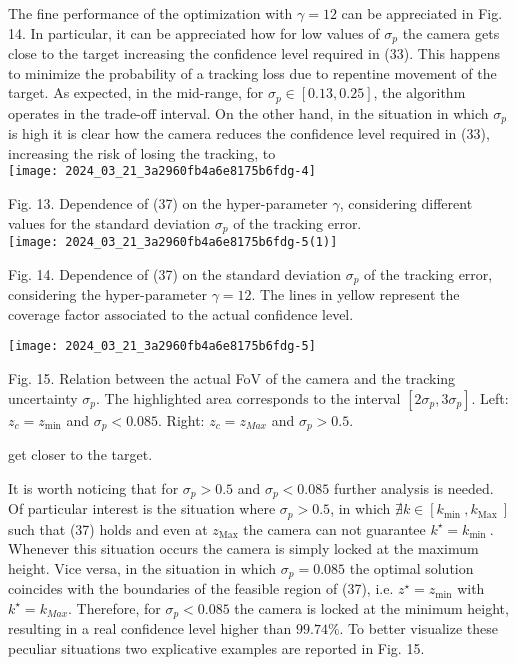 \documentclass[conference]{IEEEtran}
\begin{document}
The fine performance of the optimization with $\gamma=12$ can be appreciated in Fig. 14. In particular, it can be appreciated how for low values of $\sigma_{p}$ the camera gets close to the target increasing the confidence level required in (33). This happens to minimize the probability of a tracking loss due to repentine movement of the target. As expected, in the mid-range, for $\sigma_{p} \in[0.13,0.25]$, the algorithm operates in the trade-off interval. On the other hand, in the situation in which $\sigma_{p}$ is high it is clear how the camera reduces the confidence level required in (33), increasing the risk of losing the tracking, to\\
\texttt{[image: 2024\_03\_21\_3a2960fb4a6e8175b6fdg-4]}

Fig. 13. Dependence of (37) on the hyper-parameter $\gamma$, considering different values for the standard deviation $\sigma_{p}$ of the tracking error.\\
\texttt{[image: 2024\_03\_21\_3a2960fb4a6e8175b6fdg-5(1)]}

Fig. 14. Dependence of (37) on the standard deviation $\sigma_{p}$ of the tracking error, considering the hyper-parameter $\gamma=12$. The lines in yellow represent the coverage factor associated to the actual confidence level.

\begin{center}
\texttt{[image: 2024\_03\_21\_3a2960fb4a6e8175b6fdg-5]}
\end{center}

Fig. 15. Relation between the actual FoV of the camera and the tracking uncertainty $\sigma_{p}$. The highlighted area corresponds to the interval $\left[2 \sigma_{p}, 3 \sigma_{p}\right]$. Left: $z_{c}=z_{\min }$ and $\sigma_{p}<0.085$. Right: $z_{c}=z_{M a x}$ and $\sigma_{p}>0.5$.

get closer to the target.

It is worth noticing that for $\sigma_{p}>0.5$ and $\sigma_{p}<0.085$ further analysis is needed. Of particular interest is the situation where $\sigma_{p}>0.5$, in which $\nexists k \in\left[k_{\text {min }}, k_{\text {Max }}\right]$ such that (37) holds and even at $z_{\operatorname{Max}}$ the camera can not guarantee $k^{\star}=k_{\text {min }}$. Whenever this situation occurs the camera is simply locked at the maximum height. Vice versa, in the situation in which $\sigma_{p}=0.085$ the optimal solution coincides with the boundaries of the feasible region of (37), i.e. $z^{\star}=z_{\min }$ with $k^{\star}=k_{M a x}$. Therefore, for $\sigma_{p}<0.085$ the camera is locked at the minimum height, resulting in a real confidence level higher than $99.74 \%$. To better visualize these peculiar situations two explicative examples are reported in Fig. 15.
\end{document}
